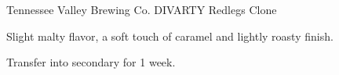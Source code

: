 \begin{recipe}{Tennessee Valley Brewing Co. DIVARTY Redlegs Clone}

\begin{aboutblock}
Slight malty flavor, a soft touch of caramel and lightly roasty finish. \sourceaha
\end{aboutblock}


\begin{methodandtiming}
 
\begin{mashsteps}
\end{mashsteps}

\begin{fermentationsteps}
\end{fermentationsteps}

\begin{directions}
Transfer into secondary for 1 week.
\end{directions}

\end{methodandtiming}

\recipebreak

\begin{ingredientsblock}

\begin{malts}
\end{malts}

\begin{hops}
\end{hops}


\end{ingredientsblock}

\end{recipe}
